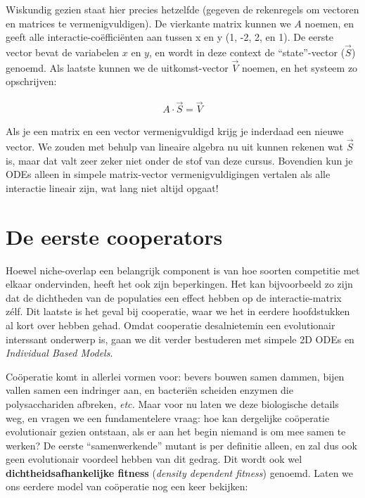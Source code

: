 \documentclass[
  a4paper,
]{scrbook}
\theoremstyle{definition}
\theoremstyle{remark}
\begin{document}
\begin{tcolorbox}
Wiskundig gezien staat hier precies hetzelfde (gegeven de rekenregels om
vectoren en matrices te vermenigvuldigen). De vierkante matrix kunnen we
\(A\) noemen, en geeft alle interactie-coëfficiënten aan tussen x en y
(1, -2, 2, en 1). De eerste vector bevat de variabelen \(x\) en \(y\),
en wordt in deze context de ``state''-vector (\(\overrightarrow{S}\))
genoemd. Als laatste kunnen we de uitkomst-vector \(\overrightarrow{V}\)
noemen, en het systeem zo opschrijven:

\begin{align}
A \cdot \overrightarrow{S} = \overrightarrow{V}
\end{align}

Als je een matrix en een vector vermenigvuldigd krijg je inderdaad een
nieuwe vector. We zouden met behulp van lineaire algebra nu uit kunnen
rekenen wat \(\overrightarrow{S}\) is, maar dat valt zeer zeker niet
onder de stof van deze cursus. Bovendien kun je ODEs alleen in simpele
matrix-vector vermenigvuldigingen vertalen als alle interactie lineair
zijn, wat lang niet altijd opgaat!

\end{tcolorbox}

\hypertarget{de-eerste-cooperators}{%
\section{De eerste cooperators}\label{de-eerste-cooperators}}

Hoewel niche-overlap een belangrijk component is van hoe soorten
competitie met elkaar ondervinden, heeft het ook zijn beperkingen. Het
kan bijvoorbeeld zo zijn dat de dichtheden van de populaties een effect
hebben op de interactie-matrix zélf. Dit laatste is het geval bij
cooperatie, waar we het in eerdere hoofdstukken al kort over hebben
gehad. Omdat cooperatie desalnietemin een evolutionair interssant
onderwerp is, gaan we dit verder bestuderen met simpele 2D ODEs en
\emph{Individual Based Models}.

Coöperatie komt in allerlei vormen voor: bevers bouwen samen dammen,
bijen vallen samen een indringer aan, en bacteriën scheiden enzymen die
polysacchariden afbreken, \emph{etc.} Maar voor nu laten we deze
biologische details weg, en vragen we een fundamentelere vraag: hoe kan
dergelijke coöperatie evolutionair gezien ontstaan, als er aan het begin
niemand is om mee samen te werken? De eerste ``samenwerkende'' mutant is
per definitie alleen, en zal dus ook geen evolutionair voordeel hebben
van dit gedrag. Dit wordt ook wel \textbf{dichtheidsafhankelijke
fitness} (\emph{density dependent fitness}) genoemd. Laten we ons
eerdere model van coöperatie nog een keer bekijken:
\end{document}
